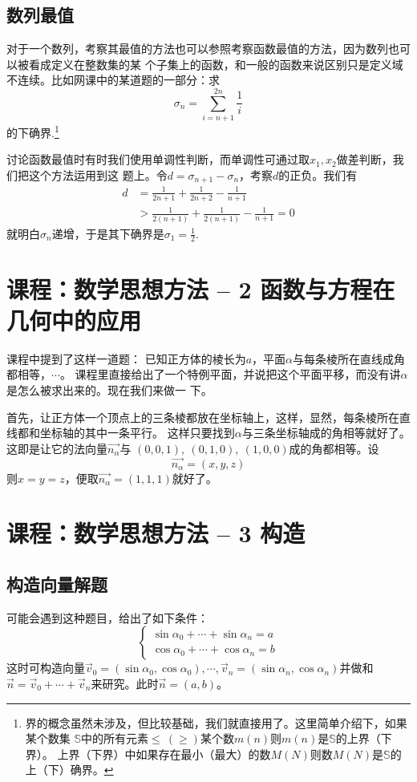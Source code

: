 \subsection{数列最值}
对于一个数列，考察其最值的方法也可以参照考察函数最值的方法，因为数列也可以被看成定义在整数集的某
个子集上的函数，和一般的函数来说区别只是定义域不连续。比如网课中的某道题的一部分：求
\[
\sigma_n = \sum_{i = n+1}^{2n}{\frac{1}{i}}
\]的下确界.\footnote{界的概念虽然未涉及，但比较基础，我们就直接用了。这里简单介绍下，如果某个数集
$\mathbb{S}$中的所有元素$\leq\ (\geq)$某个数$m(n)$则$m(n)$是$\mathbb{S}$的上界（下界）。
上界（下界）中如果存在最小（最大）的数$M(N)$则数$M(N)$是$\mathbb{S}$的上（下）确界。}

讨论函数最值时有时我们使用单调性判断，而单调性可通过取$x_1,x_2$做差判断，我们把这个方法运用到这
题上。令\(d = \sigma_{n+1} - \sigma_n\)，考察$d$的正负。我们有
\begin{align}
d 
&= \frac{1}{2n+1} + \frac{1}{2n + 2} - \frac{1}{n + 1} \nonumber \\
&> \frac{1}{2(n + 1)} + \frac{1}{2(n + 1)} - \frac{1}{n + 1} = 0
\end{align}
就明白$\sigma_n$递增，于是其下确界是$\sigma_1 = \frac{1}{2}$.

\section{课程：数学思想方法 -- 2 函数与方程在几何中的应用}
课程中提到了这样一道题：
已知正方体的棱长为$a$，平面$\alpha$与每条棱所在直线成角都相等，$\cdots$。
课程里直接给出了一个特例平面，并说把这个平面平移，而没有讲$\alpha$是怎么被求出来的。现在我们来做一
下。

首先，让正方体一个顶点上的三条棱都放在坐标轴上，这样，显然，每条棱所在直线都和坐标轴的其中一条平行。
这样只要找到$\alpha$与三条坐标轴成的角相等就好了。这即是让它的法向量$\vec{n_{\alpha}}$与
\((0,0,1),\ (0,1,0),\ (1,0,0)\)成的角都相等。设
\[
\vec{n_{\alpha}} = (x,y,z)
\]
则$x=y=z$，便取$\vec{n_{\alpha}} = (1,1,1)$就好了。

\section{课程：数学思想方法 -- 3 构造}
\subsection{构造向量解题}
可能会遇到这种题目，给出了如下条件：
\begin{equation*}
\begin{cases}
\sin{\alpha_0} + \cdots + \sin{\alpha_n} = a \\
\cos{\alpha_0} + \cdots + \cos{\alpha_n} = b
\end{cases}
\end{equation*}
这时可构造向量\(\vec{v}_0 = (\sin{\alpha_0}, \cos{\alpha_0}), \cdots, 
\vec{v}_n = (\sin{\alpha_n}, \cos{\alpha_n})\)并做和
\(\vec{n} = \vec{v}_0 + \cdots + \vec{v}_n\)来研究。此时\(\vec{n}=(a,b)\)。

